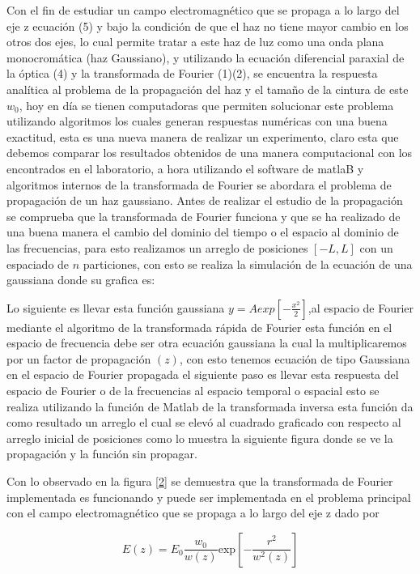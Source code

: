 \documentclass[11pt,letterpaper,twocolumn]{article}
\begin{document}
Con el fin de estudiar un campo electromagnético que se propaga a lo largo del eje z ecuación (5) y bajo la condición de que el haz no tiene mayor cambio en los otros dos ejes, lo cual  permite tratar a este haz de luz  como una onda plana monocromática  (haz Gaussiano),  y utilizando la ecuación diferencial paraxial de la óptica (4) y la transformada de Fourier (1)(2), se encuentra la respuesta analítica al problema de la propagación del haz y el tamaño de la cintura de este $w_{0}$, hoy en día se tienen computadoras que permiten solucionar este problema utilizando algoritmos los cuales generan respuestas numéricas con una buena exactitud, esta es una nueva manera de realizar un experimento, claro esta que debemos comparar los resultados obtenidos de una manera computacional con los encontrados en el laboratorio, a hora utilizando el software de matlaB y algoritmos  internos de la transformada de Fourier se abordara el problema de propagación de un haz gaussiano.
Antes de realizar el estudio de la propagación se comprueba que la transformada de Fourier funciona y que se ha realizado de una buena manera el cambio del dominio del tiempo o el espacio al dominio de las frecuencias, para esto realizamos un arreglo de posiciones $[-L,L]$ con un espaciado de $n$ particiones, con esto se realiza la simulación de la ecuación de una gaussiana donde su grafica es:


Lo siguiente es llevar esta función gaussiana $ y=Aexp\left[-\frac{x^{2}}{2}\right] $,al espacio de Fourier mediante el algoritmo de la transformada rápida de Fourier esta función en el espacio de frecuencia debe ser otra ecuación gaussiana la cual la multiplicaremos por un factor de propagación $(z)$, con esto tenemos  ecuación de tipo Gaussiana en el espacio de Fourier propagada  el siguiente paso es llevar esta respuesta del espacio de Fourier o de la frecuencias  al espacio temporal o espacial esto se realiza utilizando la función de Matlab de la transformada inversa esta función da como resultado un arreglo el cual se elevó al cuadrado  graficado   con respecto al arreglo inicial de posiciones  como lo muestra la siguiente figura donde se ve la propagación y la función sin propagar.


Con lo observado en la figura \ref{2} se demuestra que la transformada de Fourier implementada es funcionando y puede ser implementada en el problema principal con el campo electromagnético que se propaga a lo largo del eje z dado por

$$E(z)= E_{0} \frac{w_{0}}{w(z)}  \mathrm{exp} \left[-\frac{r^{2}}{w^{2}(z)}\right]$$
\end{document}
